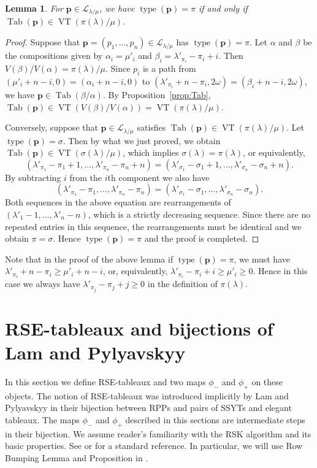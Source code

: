 \documentclass{amsart}
\numberwithin{equation}{section}
\newtheorem{lem}[thm]{Lemma}
\theoremstyle{definition}
\newcommand\type{\operatorname{type}}
\newcommand\VT{\operatorname{VT}}
\newcommand\Tab{\operatorname{Tab}}
\newcommand\LL{\mathcal{L}_\lm}
\newcommand\pd{\phi_+}
\newcommand\pu{\phi_-}
\newcommand\pp{\mathbf{p}}
\newcommand\lm{{\lambda/\mu}}
\begin{document}
\begin{lem}\label{lem:VT}
  For $\pp\in\LL$, we have $\type(\pp)=\pi$ if and only if
  $\Tab(\pp)\in\VT(\pi(\lambda)/\mu)$.
\end{lem}
\begin{proof}
  Suppose that $\pp=(p_1,\dots,p_n)\in\LL$ has $\type(\pp)=\pi$. Let $\alpha$
  and $\beta$ be the compositions given by $\alpha_i=\mu'_i$ and
  $\beta_i=\lambda'_{\pi_i}-\pi_i+i$. Then
  $V(\beta)/V(\alpha)=\pi(\lambda)/\mu$. Since $p_i$ is a path from
  $(\mu'_i+n-i,0)=(\alpha_i+n-i,0)$ to
  $(\lambda'_{\pi_i}+n-\pi_i,2\omega)=(\beta_i+n-i,2\omega)$, we have
  $\pp\in\Tab(\beta/\alpha)$. By Proposition~\ref{prop:Tab},
  $\Tab(\pp)\in\VT(V(\beta)/V(\alpha))=\VT(\pi(\lambda)/\mu)$.

  Conversely, suppose that $\pp\in\LL$ satisfies
  $\Tab(\pp)\in\VT(\pi(\lambda)/\mu)$. Let $\type(\pp)=\sigma$. Then by what we
  just proved, we obtain $\Tab(\pp)\in\VT(\sigma(\lambda)/\mu)$, which implies
  $\sigma(\lambda)=\pi(\lambda)$, or equivalently,
  \[
    (\lambda'_{\pi_1}-\pi_1+1,\dots,\lambda'_{\pi_n}-\pi_n+n)
    =(\lambda'_{\sigma_1}-\sigma_1+1,\dots, \lambda'_{\sigma_n}-\sigma_n+n). 
\]
By subtracting $i$ from the $i$th component we also have
  \[
    (\lambda'_{\pi_1}-\pi_1,\dots,\lambda'_{\pi_n}-\pi_n)
    =(\lambda'_{\sigma_1}-\sigma_1,\dots, \lambda'_{\sigma_n}-\sigma_n).
\]
Both sequences in the above equation are rearrangements of
$(\lambda'_1-1,\dots,\lambda'_n-n)$, which is a strictly decreasing sequence.
Since there are no repeated entries in this sequence, the rearrangements must be
identical and we obtain $\pi=\sigma$. Hence $\type(\pp)=\pi$ and the proof is
completed.
\end{proof}

Note that in the proof of the above lemma if $\type(\pp)=\pi$, we must have
$\lambda'_{\pi_i}+n-\pi_i\ge \mu'_i+n-i$, or, equivalently, $\lambda'_{\pi_i}-\pi_i+i\ge
\mu'_i\ge0$. Hence in this case we always have $\lambda'_{\pi_j}-\pi_j+j\ge0$ in
the definition of $\pi(\lambda)$.

\section{RSE-tableaux and bijections of Lam and Pylyavskyy}
\label{sec:rse-tableaux}

In this section we define RSE-tableaux and two maps $\pu$ and $\pd$ on these
objects. The notion of RSE-tableaux was introduced implicitly by Lam and
Pylyavskyy \cite[Proof of Theorem~9.8]{LP2007} in their bijection between RPPs
and pairs of SSYTs and elegant tableaux. The maps $\pu$ and $\pd$ described in
this sections are intermediate steps in their bijection. We assume reader's
familiarity with the RSK algorithm and its basic properties. See
\cite[Section~1.1]{Fulton1997} or \cite[Section~7.11]{EC2} for a standard
reference. In particular, we will use Row Bumping Lemma and Proposition in
\cite[Section~1.1]{Fulton1997}.
\end{document}
